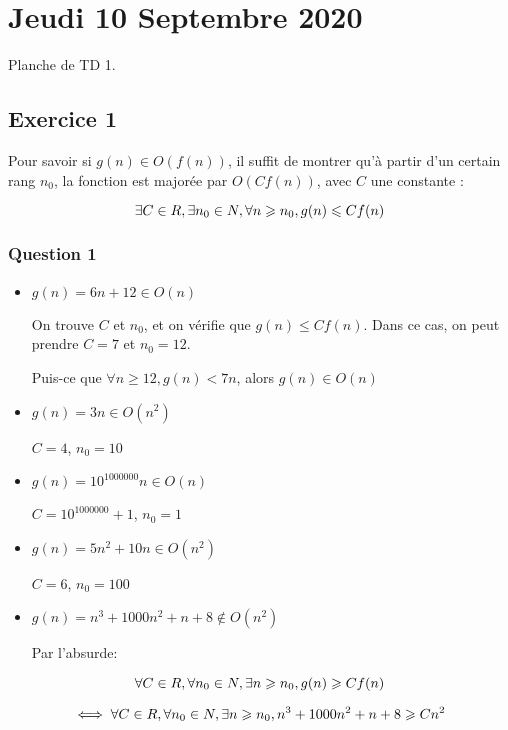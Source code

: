 \hypertarget{jeudi-10-septembre-2020}{%
\section{Jeudi 10 Septembre 2020}\label{jeudi-10-septembre-2020}}

Planche de TD 1.

\hypertarget{exercice-1}{%
\subsection{Exercice 1}\label{exercice-1}}

Pour savoir si \(g(n) \in O(f(n))\), il suffit de montrer qu'à partir
d'un certain rang \(n_0\), la fonction est majorée par \(O(Cf(n))\),
avec \(C\) une constante :

$$
\exists C \in \\R, \exists n_0 \in N, \forall n \geqslant n_0, g(n) \leqslant Cf(n)
$$

\hypertarget{question-1}{%
\subsubsection{Question 1}\label{question-1}}

\begin{itemize}
\item
  \(g(n) = 6n + 12 \in O(n)\)

  On trouve \(C\) et \(n_0\), et on vérifie que
  \(g(n) \leqslant Cf(n)\). Dans ce cas, on peut prendre \(C=7\) et
  \(n_0=12\).

  Puis-ce que \(\forall n \geqslant 12, g(n) < 7n\), alors
  \(g(n) \in O(n)\)
\item
  \(g(n) = 3n \in O(n^2)\)

  \(C=4\), \(n_0=10\)
\item
  \(g(n) = 10^{1000000}n \in O(n)\)

  \(C=10^{1000000}+1\), \(n_0=1\)
\item
  \(g(n) = 5n^2+10n \in O(n^2)\)

  \(C=6\), \(n_0=100\)
\item
  \(g(n) = n^3+1000n^2+n+8 \notin O(n^2)\)

  Par l'absurde:
\end{itemize}

\[
\forall C \in \\R, \forall n_0 \in N, \exists n \geqslant n_0, g(n) \geqslant Cf(n)
\]

\[
\iff \forall C \in \\R, \forall n_0 \in N, \exists n \geqslant n_0, n^3+1000n^2+n+8 \geqslant Cn^2 
\]

